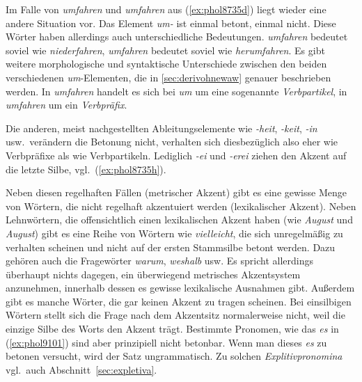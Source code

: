\begin{exe}
  \ex\label{ex:fokuskomp}
  \begin{xlist}
  \end{xlist}
\end{exe}

Im Falle von \textit{\Akz umfahren} und \textit{um\Akz fahren} aus (\ref{ex:phol8735d}) liegt wieder eine andere Situation vor.
Das Element \textit{um-} ist einmal betont, einmal nicht.
Diese Wörter haben allerdings auch unterschiedliche Bedeutungen.
\textit{\Akz umfahren} bedeutet soviel wie \textit{niederfahren}, \textit{um\Akz fahren} bedeutet soviel wie \textit{herumfahren}.
Es gibt weitere morphologische und syntaktische Unterschiede zwischen den beiden verschiedenen \textit{um}-Elementen, die in \ref{sec:derivohnewaw} genauer beschrieben werden.
In \textit{\Akz umfahren} handelt es sich bei \textit{um} um eine sogenannte \textit{Verbpartikel}, in \textit{um\Akz fahren} um ein \textit{Verbpräfix}.


Die anderen, meist nachgestellten Ableitungselemente wie \textit{-heit}, \textit{-keit}, \textit{-in} usw.\ verändern die Betonung nicht, verhalten sich diesbezüglich also eher wie Verbpräfixe als wie Verbpartikeln.
Lediglich \textit{-ei} und \textit{-erei} ziehen den Akzent auf die letzte Silbe, vgl.\ (\ref{ex:phol8735h}).

Neben diesen regelhaften Fällen (metrischer Akzent) gibt es eine gewisse Menge von Wörtern, die nicht regelhaft akzentuiert werden (lexikalischer Akzent).
Neben Lehnwörtern, die offensichtlich einen lexikalischen Akzent haben (wie \textit{\Akz August} und \textit{Au\Akz gust}) gibt es eine Reihe von Wörtern wie \textit{vie\Akz lleicht}, die sich unregelmäßig zu verhalten scheinen und nicht auf der ersten Stammsilbe betont werden.
Dazu gehören auch die Fragewörter \textit{wa\Akz rum}, \textit{wes\Akz halb} usw.
Es spricht allerdings überhaupt nichts dagegen, ein überwiegend metrisches Akzentsystem anzunehmen, innerhalb dessen es gewisse lexikalische Ausnahmen gibt.
Außerdem gibt es manche Wörter, die gar keinen Akzent zu tragen scheinen.
Bei einsilbigen Wörtern stellt sich die Frage nach dem Akzentsitz normalerweise nicht, weil die einzige Silbe des Worts den Akzent trägt.
Bestimmte Pronomen, wie das \textit{es} in (\ref{ex:phol9101}) sind aber prinzipiell nicht betonbar.
Wenn man dieses \textit{es} zu betonen versucht, wird der Satz ungrammatisch.
Zu solchen \textit{Explitivpronomina} vgl.\ auch Abschnitt~\ref{sec:expletiva}.

